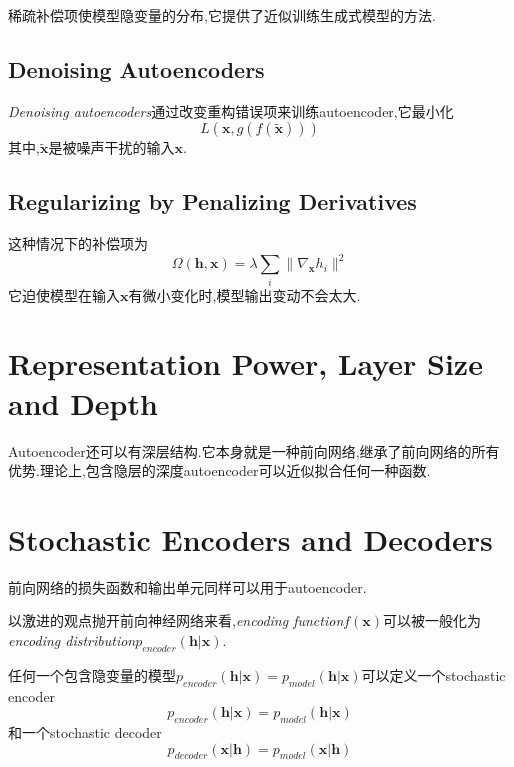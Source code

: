 稀疏补偿项使模型隐变量的分布,它提供了近似训练生成式模型的方法.

\subsection{Denoising Autoencoders}

\textit{Denoising autoencoders}通过改变重构错误项来训练autoencoder,它最小化
\begin{equation}
L(\mathbf x,g(f(\tilde{\mathbf x})))
\end{equation}
其中,$\tilde{\mathbf x}$是被噪声干扰的输入$\mathbf x$.

\subsection{Regularizing by Penalizing Derivatives}

这种情况下的补偿项为
\begin{equation}
\Omega(\mathbf{h,x})=\lambda\sum_i\|\nabla_{\mathbf x}h_i\|^2
\end{equation}
它迫使模型在输入$\mathbf x$有微小变化时,模型输出变动不会太大.

\section{Representation Power, Layer Size and Depth}

Autoencoder还可以有深层结构.它本身就是一种前向网络,继承了前向网络的所有优势.理论上,包含隐层的深度autoencoder可以近似拟合任何一种函数.

\section{Stochastic Encoders and Decoders}

前向网络的损失函数和输出单元同样可以用于autoencoder.

以激进的观点抛开前向神经网络来看,\textit{encoding function}$f(\mathbf x)$可以被一般化为\textit{encoding distribution}$p_{encoder}(\mathbf{h|x})$.

任何一个包含隐变量的模型$p_{encoder}(\mathbf{h|x})=p_{model}(\mathbf{h|x})$可以定义一个stochastic encoder
\begin{equation}
p_{encoder}(\mathbf{h|x})=p_{model}(\mathbf{h|x})
\end{equation}
和一个stochastic decoder
\begin{equation}
p_{decoder}(\mathbf{x|h})=p_{model}(\mathbf{x|h})
\end{equation}

